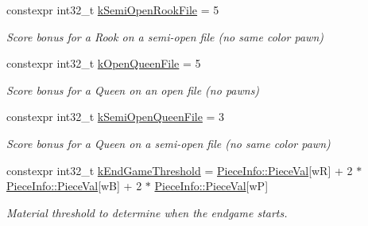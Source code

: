 \begin{DoxyCompactItemize}
\mbox{\label{namespaceValue_a81946dee27fcd0bd24d914082169be38}} 
constexpr int32\+\_\+t \mbox{\hyperlink{namespaceValue_a81946dee27fcd0bd24d914082169be38}{k\+Semi\+Open\+Rook\+File}} = 5
\begin{DoxyCompactList}\small\item\em Score bonus for a Rook on a semi-\/open file (no same color pawn) \end{DoxyCompactList}\item 
\mbox{\label{namespaceValue_a1b62aec2245b0434f86252680fe2d837}} 
constexpr int32\+\_\+t \mbox{\hyperlink{namespaceValue_a1b62aec2245b0434f86252680fe2d837}{k\+Open\+Queen\+File}} = 5
\begin{DoxyCompactList}\small\item\em Score bonus for a Queen on an open file (no pawns) \end{DoxyCompactList}\item 
\mbox{\label{namespaceValue_a4d8e9e3283f0dfb8767defd3c4375bf9}} 
constexpr int32\+\_\+t \mbox{\hyperlink{namespaceValue_a4d8e9e3283f0dfb8767defd3c4375bf9}{k\+Semi\+Open\+Queen\+File}} = 3
\begin{DoxyCompactList}\small\item\em Score bonus for a Queen on a semi-\/open file (no same color pawn) \end{DoxyCompactList}\item 
\mbox{\label{namespaceValue_aba807f233f0cb45bc9479d3b2697450b}} 
constexpr int32\+\_\+t \mbox{\hyperlink{namespaceValue_aba807f233f0cb45bc9479d3b2697450b}{k\+End\+Game\+Threshold}} = \mbox{\hyperlink{namespacePieceInfo_a480c1e7f0033918244741fc9621ad985}{Piece\+Info\+::\+Piece\+Val}}\mbox{[}wR\mbox{]} + 2 $\ast$ \mbox{\hyperlink{namespacePieceInfo_a480c1e7f0033918244741fc9621ad985}{Piece\+Info\+::\+Piece\+Val}}\mbox{[}wB\mbox{]} + 2 $\ast$ \mbox{\hyperlink{namespacePieceInfo_a480c1e7f0033918244741fc9621ad985}{Piece\+Info\+::\+Piece\+Val}}\mbox{[}wP\mbox{]}
\begin{DoxyCompactList}\small\item\em Material threshold to determine when the endgame starts. \end{DoxyCompactList}\item 
\mbox{\label{namespaceValue_a662b268cafa7fb0924985d533150c6c2}} 

\end{DoxyCompactItemize}
